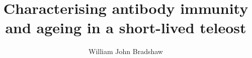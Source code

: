 \title{Characterising antibody immunity and ageing in a short-lived teleost}


\author{William John Bradshaw}







\supervisorlinewidth{\textwidth}






